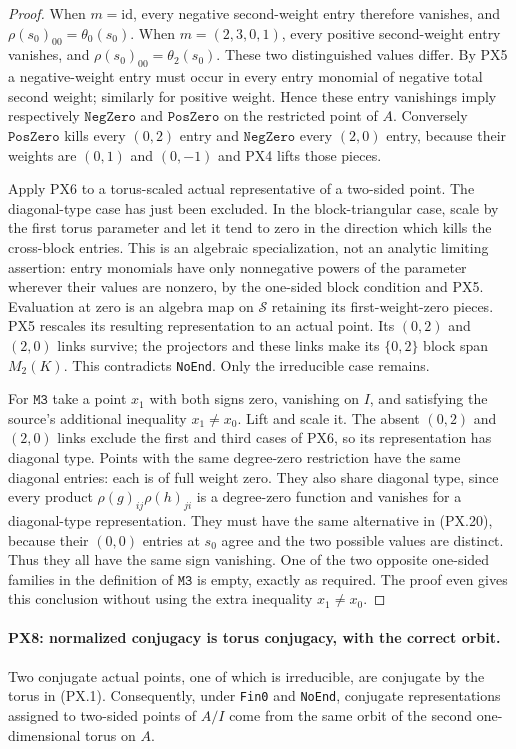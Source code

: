 \begin{proof}
When $m=\mathrm{id}$, every negative
second-weight entry therefore vanishes,
and $\rho(s_0)_{00}=\theta_0(s_0)$.
When $m=(2,3,0,1)$, every positive
second-weight entry vanishes, and
$\rho(s_0)_{00}=\theta_2(s_0)$.
These two distinguished values differ.
By PX5 a negative-weight entry must
occur in every entry monomial of
negative total second weight; similarly
for positive weight.  Hence these
entry vanishings imply respectively
$\mathtt{NegZero}$ and $\mathtt{PosZero}$
on the restricted point of $A$.
Conversely $\mathtt{PosZero}$ kills
every $(0,2)$ entry and
$\mathtt{NegZero}$ every $(2,0)$ entry,
because their weights are $(0,1)$ and
$(0,-1)$ and PX4 lifts those pieces.

Apply PX6 to a torus-scaled actual
representative of a two-sided point.
The diagonal-type case has just been
excluded.  In the block-triangular
case, scale by the first torus parameter
and let it tend to zero in the direction
which kills the cross-block entries.
This is an algebraic specialization,
not an analytic limiting assertion:
entry monomials have only nonnegative
powers of the parameter wherever their
values are nonzero, by the one-sided
block condition and PX5.  Evaluation
at zero is an algebra map on
$\mathcal S$ retaining its first-weight-zero
pieces.  PX5 rescales its resulting
representation to an actual point.
Its $(0,2)$ and $(2,0)$ links survive;
the projectors and these links make its
$\{0,2\}$ block span $M_2(K)$.
This contradicts \texttt{NoEnd}.  Only
the irreducible case remains.

For $\mathtt{M3}$ take a point $x_1$
with both signs zero, vanishing on $I$,
and satisfying the source's additional
inequality $x_1\ne x_0$.  Lift and
scale it.  The absent $(0,2)$ and
$(2,0)$ links exclude the first and
third cases of PX6, so its representation
has diagonal type.  Points with the
same degree-zero restriction have the
same diagonal entries: each is of
full weight zero.  They also share
diagonal type, since every product
$\rho(g)_{ij}\rho(h)_{ji}$ is a
degree-zero function and vanishes
for a diagonal-type representation.
They must have the same alternative
in (PX.20), because their $(0,0)$
entries at $s_0$ agree and the two
possible values are distinct.
Thus they all have the same sign
vanishing.  One of the two opposite
one-sided families in the definition
of $\mathtt{M3}$ is empty, exactly
as required.  The proof even gives
this conclusion without using the
extra inequality $x_1\ne x_0$.
\end{proof}

\paragraph{PX8: normalized conjugacy is torus conjugacy, with the correct orbit.}
\label{claim:PX8}
Two conjugate actual points, one of which is irreducible,
are conjugate by the torus in (PX.1).  Consequently, under
\texttt{Fin0} and \texttt{NoEnd}, conjugate representations assigned to
two-sided points of $A/I$ come from the same orbit of the
second one-dimensional torus on $A$.


